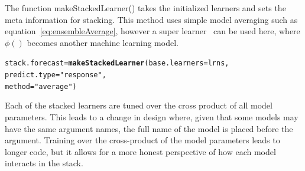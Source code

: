 \documentclass[12pt]{article}\usepackage[]{graphicx}\usepackage[]{color}
\makeatletter
\newcommand{\hlstr}[1]{\textcolor[rgb]{0.192,0.494,0.8}{#1}}%
\newcommand{\hlstd}[1]{\textcolor[rgb]{0.345,0.345,0.345}{#1}}%
\newcommand{\hlkwb}[1]{\textcolor[rgb]{0.69,0.353,0.396}{#1}}%
\newcommand{\hlkwc}[1]{\textcolor[rgb]{0.333,0.667,0.333}{#1}}%
\newcommand{\hlkwd}[1]{\textcolor[rgb]{0.737,0.353,0.396}{\textbf{#1}}}%
\newenvironment{kframe}{%
 \def\at@end@of@kframe{}%
 \ifinner\ifhmode%
  \def\at@end@of@kframe{\end{minipage}}%
  \begin{minipage}{\columnwidth}%
 \fi\fi%
 \def\FrameCommand##1{\hskip\@totalleftmargin \hskip-\fboxsep
 \colorbox{shadecolor}{##1}\hskip-\fboxsep
     \hskip-\linewidth \hskip-\@totalleftmargin \hskip\columnwidth}%
 \MakeFramed {\advance\hsize-\width
   \@totalleftmargin\z@ \linewidth\hsize
   \@setminipage}}%
 {\par\unskip\endMakeFramed%
 \at@end@of@kframe}
\newenvironment{knitrout}{}{} %
\theoremstyle{definition}
\newcommand\code{\@codex}
\def\@codex#1{{\normalfont\ttfamily\hyphenchar\font=-1 #1}}
\makeatother
\begin{document}
The function \code{makeStackedLearner()} takes the initialized learners and sets the meta information for stacking. This method uses simple model averaging such as equation~\ref{eq:ensembleAverage}, however a super learner~\cite{Wolpert92stackedgeneralization} can be used here, where $\phi()$ becomes another machine learning model.

\singlespacing
\begin{knitrout}
\color{fgcolor}\begin{kframe}
\begin{alltt}
\hlstd{stack.forecast} \hlkwb{=} \hlkwd{makeStackedLearner}\hlstd{(}\hlkwc{base.learners} \hlstd{= lrns,}
                       \hlkwc{predict.type} \hlstd{=} \hlstr{"response"}\hlstd{,}
                       \hlkwc{method} \hlstd{=} \hlstr{"average"}\hlstd{)}
\end{alltt}
\end{kframe}
\end{knitrout}
\doublespacing

Each of the stacked learners are tuned over the cross product of all model parameters. This leads to a change in design where, given that some models may have the same argument names, the full name of the model is placed before the argument. Training over the cross-product of the model parameters leads to longer code, but it allows for a more honest perspective of how each model interacts in the stack.
\end{document}
